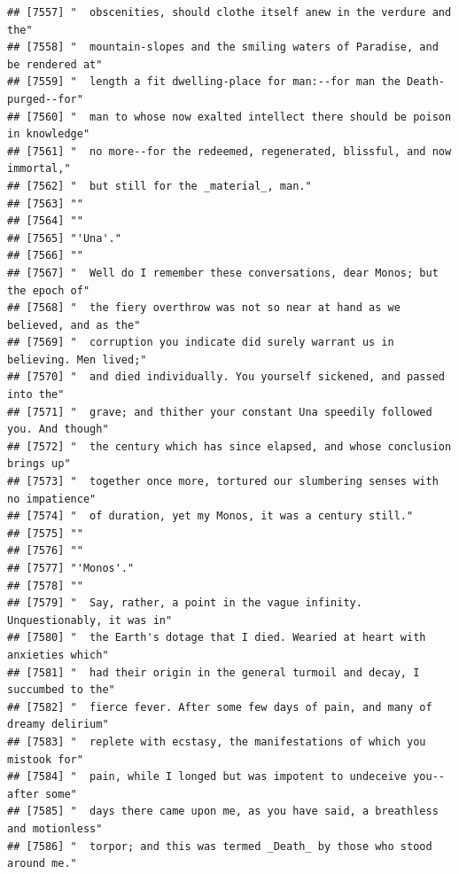 \documentclass{article}\usepackage[]{graphicx}\usepackage[]{color}
\makeatletter
\newenvironment{kframe}{%
 \def\at@end@of@kframe{}%
 \ifinner\ifhmode%
  \def\at@end@of@kframe{\end{minipage}}%
  \begin{minipage}{\columnwidth}%
 \fi\fi%
 \def\FrameCommand##1{\hskip\@totalleftmargin \hskip-\fboxsep
 \colorbox{shadecolor}{##1}\hskip-\fboxsep
     \hskip-\linewidth \hskip-\@totalleftmargin \hskip\columnwidth}%
 \MakeFramed {\advance\hsize-\width
   \@totalleftmargin\z@ \linewidth\hsize
   \@setminipage}}%
 {\par\unskip\endMakeFramed%
 \at@end@of@kframe}
\newenvironment{knitrout}{}{} %
\makeatother
\begin{document}
\begin{knitrout}
\begin{kframe}
\begin{verbatim}
## [7557] "  obscenities, should clothe itself anew in the verdure and the"             
## [7558] "  mountain-slopes and the smiling waters of Paradise, and be rendered at"    
## [7559] "  length a fit dwelling-place for man:--for man the Death-purged--for"       
## [7560] "  man to whose now exalted intellect there should be poison in knowledge"    
## [7561] "  no more--for the redeemed, regenerated, blissful, and now immortal,"       
## [7562] "  but still for the _material_, man."                                        
## [7563] ""                                                                            
## [7564] ""                                                                            
## [7565] "'Una'."                                                                      
## [7566] ""                                                                            
## [7567] "  Well do I remember these conversations, dear Monos; but the epoch of"      
## [7568] "  the fiery overthrow was not so near at hand as we believed, and as the"    
## [7569] "  corruption you indicate did surely warrant us in believing. Men lived;"    
## [7570] "  and died individually. You yourself sickened, and passed into the"         
## [7571] "  grave; and thither your constant Una speedily followed you. And though"    
## [7572] "  the century which has since elapsed, and whose conclusion brings up"       
## [7573] "  together once more, tortured our slumbering senses with no impatience"     
## [7574] "  of duration, yet my Monos, it was a century still."                        
## [7575] ""                                                                            
## [7576] ""                                                                            
## [7577] "'Monos'."                                                                    
## [7578] ""                                                                            
## [7579] "  Say, rather, a point in the vague infinity. Unquestionably, it was in"     
## [7580] "  the Earth's dotage that I died. Wearied at heart with anxieties which"     
## [7581] "  had their origin in the general turmoil and decay, I succumbed to the"     
## [7582] "  fierce fever. After some few days of pain, and many of dreamy delirium"    
## [7583] "  replete with ecstasy, the manifestations of which you mistook for"         
## [7584] "  pain, while I longed but was impotent to undeceive you--after some"        
## [7585] "  days there came upon me, as you have said, a breathless and motionless"    
## [7586] "  torpor; and this was termed _Death_ by those who stood around me."         

\end{verbatim}
\end{kframe}
\end{knitrout}
\end{document}

